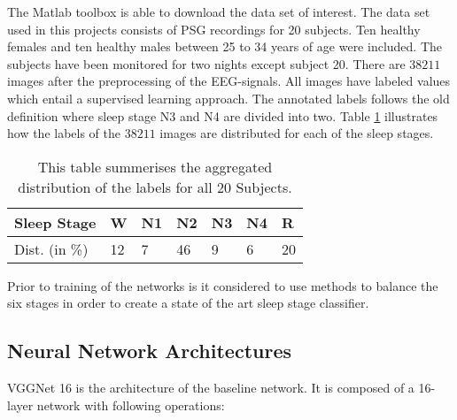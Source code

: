 The Matlab toolbox is able to download the data set of interest. The data set used in this projects consists of PSG recordings for 20 subjects. Ten healthy females and ten healthy males between 25 to 34 years of age were included. The subjects have been monitored for two nights except subject 20. There are $38211$ images after the preprocessing of the EEG-signals. All images have labeled values which entail a supervised learning approach. The annotated labels follows the old definition where sleep stage N3 and N4 are divided into two. Table \ref{tab_class_balance} illustrates how the labels of the $38211$ images are distributed for each of the sleep stages.

\begin{table}[th!]
\begin{tabular}{l|llllll}
Sleep Stage & W & N1 &  N2& N3 & N4 & R \\\hline
Dist. (in \%) &12 &7&46&9&6&20
\end{tabular}
\caption{This table summerises the aggregated distribution of the labels for all 20 Subjects. }
\label{tab_class_balance}
\end{table}

Prior to training of the networks is it considered to use methods to balance the six stages in order to create a state of the art sleep stage classifier.

\subsection{Neural Network Architectures}
VGGNet 16 \cite{main_ar, VGGnet16} is the architecture of the baseline network. It is composed of a 16-layer network with following operations:

